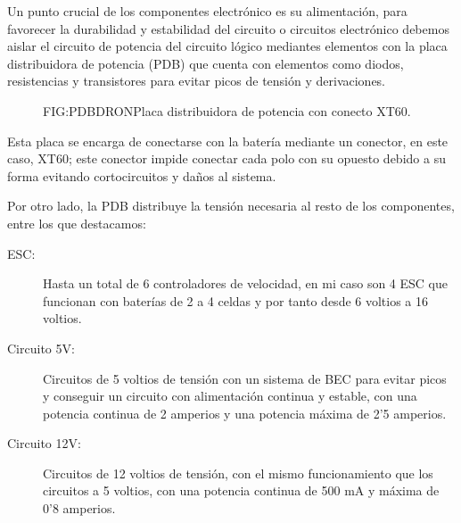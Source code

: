 
Un punto crucial de los componentes electrónico es su alimentación, para favorecer la durabilidad y estabilidad del circuito o circuitos electrónico debemos aislar el circuito de potencia del circuito lógico mediantes elementos con la placa distribuidora de potencia (PDB) que cuenta con elementos como diodos, resistencias y transistores para evitar picos de tensión y derivaciones.

\begin{figure}{FIG:PDBDRON}{Placa distribuidora de potencia con conecto XT60.}
\end{figure}

Esta placa se encarga de conectarse con la batería mediante un conector, en este caso, XT60; este conector impide conectar cada polo con su opuesto debido a su forma evitando cortocircuitos y daños al sistema.

Por otro lado, la PDB distribuye la tensión necesaria al resto de los componentes, entre los que destacamos:

\begin{description}
        \item[ESC:] Hasta un total de 6 controladores de velocidad, en mi caso son 4 ESC que funcionan con baterías de 2 a 4 celdas y por tanto desde 6 voltios a 16 voltios.
        \item [Circuito 5V:] Circuitos de 5 voltios de tensión con un sistema de BEC para evitar picos y conseguir un circuito con alimentación continua y estable, con una potencia continua de 2 amperios y una potencia máxima de 2'5 amperios.
        \item [Circuito 12V:] Circuitos de 12 voltios de tensión, con el mismo funcionamiento que los circuitos a 5 voltios, con una potencia continua de 500 mA y máxima de 0'8 amperios.
\end{description}

